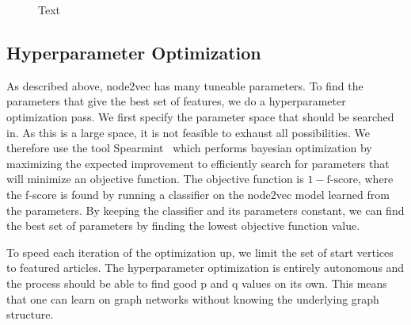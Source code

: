 

\begin{figure}[tbp]%
  \centering
  
  
\caption[short desc]{Text}%
\label{fig:n2v-figure}%
\end{figure}


\subsection{Hyperparameter Optimization}
As described above, node2vec has many tuneable parameters. To find the parameters that give the best set of features, we do a hyperparameter optimization pass. We first specify the parameter space that should be searched in. As this is a large space, it is not feasible to exhaust all possibilities. We therefore use the tool Spearmint~\cite{snoek2012practical} which performs bayesian optimization by maximizing the expected improvement to efficiently search for parameters that will minimize an objective function. The objective function is $1 - \text{f-score}$, where the f-score is found by running a classifier on the node2vec model learned from the parameters. By keeping the classifier and its parameters constant, we can find the best set of parameters by finding the lowest objective function value.

To speed each iteration of the optimization up, we limit the set of start vertices to featured articles. The hyperparameter optimization is entirely autonomous and the process should be able to find good p and q values on its own. This means that one can learn on graph networks without knowing the underlying graph structure.

